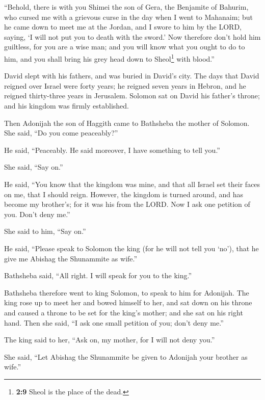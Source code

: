  ``Behold, there is with you Shimei the son of Gera, the
Benjamite of Bahurim, who cursed me with a grievous curse in the day
when I went to Mahanaim; but he came down to meet me at the Jordan, and
I swore to him by the LORD, saying, `I will not put you to death with
the sword.'  Now therefore don't hold him guiltless, for
you are a wise man; and you will know what you ought to do to him, and
you shall bring his grey head down to Sheol\footnote{\textbf{2:9} Sheol
  is the place of the dead.} with blood.''

 David slept with his fathers, and was buried in David's
city.  The days that David reigned over Israel were forty
years; he reigned seven years in Hebron, and he reigned thirty-three
years in Jerusalem.  Solomon sat on David his father's
throne; and his kingdom was firmly established.

 Then Adonijah the son of Haggith came to Bathsheba the
mother of Solomon. She said, ``Do you come peaceably?''

He said, ``Peaceably.  He said moreover, I have something
to tell you.''

She said, ``Say on.''

 He said, ``You know that the kingdom was mine, and that
all Israel set their faces on me, that I should reign. However, the
kingdom is turned around, and has become my brother's; for it was his
from the LORD.  Now I ask one petition of you. Don't deny
me.''

She said to him, ``Say on.''

 He said, ``Please speak to Solomon the king (for he will
not tell you `no'), that he give me Abishag the Shunammite as wife.''

 Bathsheba said, ``All right. I will speak for you to the
king.''

 Bathsheba therefore went to king Solomon, to speak to
him for Adonijah. The king rose up to meet her and bowed himself to her,
and sat down on his throne and caused a throne to be set for the king's
mother; and she sat on his right hand.  Then she said,
``I ask one small petition of you; don't deny me.''

The king said to her, ``Ask on, my mother, for I will not deny you.''

 She said, ``Let Abishag the Shunammite be given to
Adonijah your brother as wife.''

